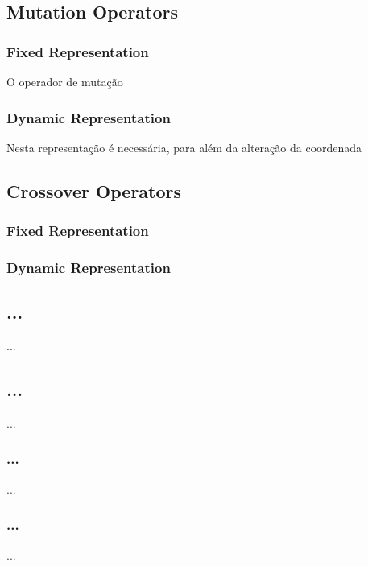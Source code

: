 \documentclass[a4paper]{article}
\begin{document}
\cleardoublepage
\subsection{Mutation Operators}
\subsubsection{Fixed Representation}
\indent \indent O operador de mutação

\subsubsection{Dynamic Representation}
\indent \indent Nesta representação é necessária, para além da alteração da coordenada


\cleardoublepage
\subsection{Crossover Operators}
\subsubsection{Fixed Representation}
\indent \indent 

\subsubsection{Dynamic Representation}
\indent \indent 

\indent \indent 


\cleardoublepage

\subsection{...}
\indent \indent ...

\subsection{...}
\indent \indent ...

\subsubsection{...}
\indent \indent ...

\subsubsection{...}
\indent \indent ...
\end{document}
